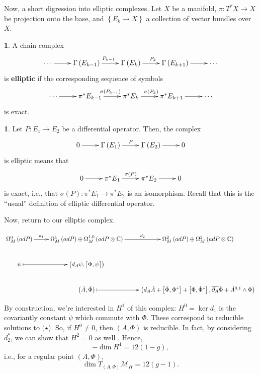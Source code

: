 \documentclass[oneside,english]{amsbook}
\numberwithin{section}{chapter}
\numberwithin{equation}{section}
\numberwithin{figure}{section}
\theoremstyle{plain}
\theoremstyle{definition}
\newtheorem{defn}[thm]{\protect\definitionname}
\theoremstyle{remark}
\theoremstyle{definition}
\newtheorem*{example*}{\protect\examplename}
\theoremstyle{definition}
\theoremstyle{plain}
\providecommand{\definitionname}{Definition}
\providecommand{\examplename}{Example}
\begin{document}
Now, a short digression into elliptic complexes. Let $X$ be a manifold,
$\pi:T^{*}X\rightarrow X$ be projection onto the base, and $\left\{ E_{k}\rightarrow X\right\} $
a collection of vector bundles over $X$. 
\begin{defn}
A chain complex 
\[
\xymatrix{\cdots\ar[r] & \Gamma\left(E_{k-1}\right)\ar[r]^{P_{k-1}} & \Gamma\left(E_{k}\right)\ar[r]^{P_{k}} & \Gamma\left(E_{k+1}\right)\ar[r] & \cdots}
\]
is \textbf{elliptic} if the corresponding sequence of symbols 
\[
\xymatrix{\cdots\ar[r] & \pi^{*}E_{k-1}\ar[r]^{\sigma\left(P_{k-1}\right)} & \pi^{*}E_{k}\ar[r]^{\sigma\left(P_{k}\right)} & \pi^{*}E_{k+1}\ar[r] & \cdots}
\]
is exact.\end{defn}
\begin{example*}
Let $P:E_{1}\rightarrow E_{2}$ be a differential operator. Then,
the complex 
\[
\xymatrix{0\ar[r] & \Gamma\left(E_{1}\right)\ar[r]^{P} & \Gamma\left(E_{2}\right)\ar[r] & 0}
\]
is elliptic means that 
\[
\xymatrix{0\ar[r] & \pi^{*}E_{1}\ar[r]^{\sigma\left(P\right)} & \pi^{*}E_{2}\ar[r] & 0}
\]
is exact, i.e., that $\sigma\left(P\right):\pi^{*}E_{1}\rightarrow\pi^{*}E_{2}$
is an isomorphism. Recall that this is the ``usual'' definition
of elliptic differential operator. 
\end{example*}
Now, return to our elliptic complex. 

\[
\xymatrix{\Omega_{M}^{0}\left(adP\right)\ar[r]^-{d_{1}} & \Omega_{M}^{1}\left(adP\right)\oplus\Omega_{M}^{1,0}\left(adP\otimes\mathbb{C}\right)\ar[r]^-{d_{2}} & \Omega_{M}^{2}\left(adP\right)\oplus\Omega_{M}^{2}\left(adP\otimes\mathbb{C}\right)\\
\dot{\psi}\ar@{|->}[r] & \left(d_{A}\dot{\psi},\left[\Phi,\dot{\psi}\right]\right)\\
 & \left(\dot{A},\dot{\Phi}\right)\ar@{|->}[r] & \left(d_{A}\dot{A}+\left[\dot{\Phi},\Phi^{*}\right]+\left[\Phi,\dot{\Phi}^{*}\right],\overline{\partial_{A}}\dot{\Phi}+\dot{A}^{0,1}\wedge\Phi\right)
}
\] 

By construction, we're interested in $H^{1}$ of this complex: $H^{0}=\ker d_{1}$
is the covariantly constant $\dot{\psi}$ which commute with $\Phi$.
These correspond to reducible solutions to $(\star$). So, if $H^{0}\neq0$,
then $\left(A,\Phi\right)$ is reducible. In fact, by considering
$d_{2}^{*}$, we can show that $H^{2}=0$ as well \cite{H1}. Hence,
\[
-\dim H^{1}=12\left(1-g\right),
\]
i.e., for a regular point $\left(A,\Phi\right)$, 
\[
\boxed{\dim T_{\left(A,\Phi\right)}\mathcal{M}_{H}=12\left(g-1\right)}.
\]
\end{document}
